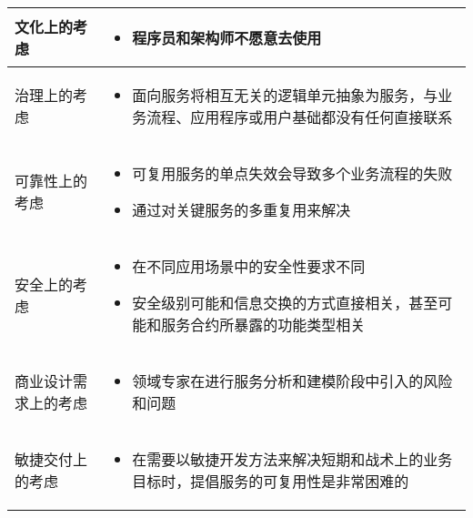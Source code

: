 \begin{longtable}{|m{3cm}<{\centering}|m{12cm}|}
    \hline
    文化上的考虑
    & 
    \vspace{-1.3em}
    \begin{itemize}[leftmargin=1.5em,itemsep=-3pt,topsep=-3pt]
        \item 程序员和架构师不愿意去使用
    \vspace{-1.5em}
    \end{itemize}  
    \\ \hline
    治理上的考虑
    & 
    \vspace{-1.3em}
    \begin{itemize}[leftmargin=1.5em,itemsep=-3pt,topsep=-3pt]
        \item 面向服务将相互无关的逻辑单元抽象为服务，与业务流程、应用程序或用户基础都没有任何直接联系
    \vspace{-1.5em}
    \end{itemize}  
    \\ \hline
    可靠性上的考虑
    & 
    \vspace{-1.3em}
    \begin{itemize}[leftmargin=1.5em,itemsep=-3pt,topsep=-3pt]
        \item 可复用服务的单点失效会导致多个业务流程的失败
        \item 通过对关键服务的多重复用来解决
    \vspace{-1.5em}
    \end{itemize}  
    \\ \hline
    安全上的考虑
    & 
    \vspace{-1.3em}
    \begin{itemize}[leftmargin=1.5em,itemsep=-3pt,topsep=-3pt]
        \item 在不同应用场景中的安全性要求不同
        \item 安全级别可能和信息交换的方式直接相关，甚至可能和服务合约所暴露的功能类型相关
    \vspace{-1.5em}
    \end{itemize}  
    \\ \hline
    商业设计需求上的考虑
    & 
    \vspace{-1.3em}
    \begin{itemize}[leftmargin=1.5em,itemsep=-3pt,topsep=-3pt]
        \item 领域专家在进行服务分析和建模阶段中引入的风险和问题
    \vspace{-1.5em}
    \end{itemize}  
    \\ \hline
    敏捷交付上的考虑
    & 
    \vspace{-1.3em}
    \begin{itemize}[leftmargin=1.5em,itemsep=-3pt,topsep=-3pt]
        \item 在需要以敏捷开发方法来解决短期和战术上的业务目标时，提倡服务的可复用性是非常困难的
    \vspace{-1.5em}
    \end{itemize}  
    \\ \hline
\end{longtable}